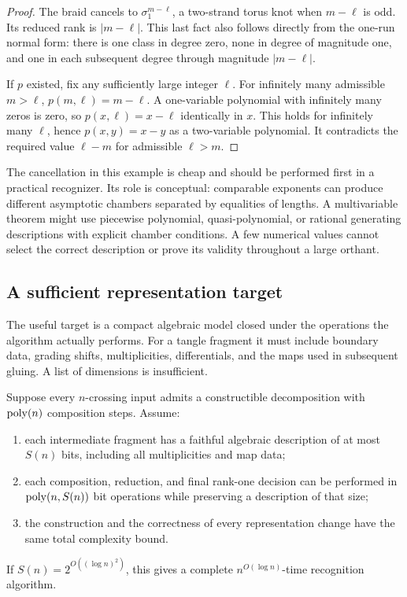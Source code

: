 \begin{proof}
The braid cancels to \(\sigma_1^{m-\ell}\), a two-strand torus knot
when \(m-\ell\) is odd. Its reduced rank is \(|m-\ell|\).
This last fact also follows directly from the one-run normal form:
there is one class in degree zero, none in degree of magnitude one,
and one in each subsequent degree through magnitude \(|m-\ell|\).

If \(p\) existed, fix any sufficiently large integer \(\ell\).
For infinitely many admissible \(m>\ell\),
\(p(m,\ell)=m-\ell\). A one-variable polynomial with infinitely many
zeros is zero, so \(p(x,\ell)=x-\ell\) identically in \(x\).
This holds for infinitely many \(\ell\), hence
\(p(x,y)=x-y\) as a two-variable polynomial.
It contradicts the required value \(\ell-m\) for admissible
\(\ell>m\).
\end{proof}

The cancellation in this example is cheap and should be performed first
in a practical recognizer. Its role is conceptual: comparable exponents
can produce different asymptotic chambers separated by equalities of
lengths. A multivariable theorem might use piecewise polynomial,
quasi-polynomial, or rational generating descriptions with explicit
chamber conditions. A few numerical values cannot select the correct
description or prove its validity throughout a large orthant.

\subsection{A sufficient representation target}

The useful target is a compact algebraic model closed under the operations
the algorithm actually performs. For a tangle fragment it must include
boundary data, grading shifts, multiplicities, differentials, and the
maps used in subsequent gluing. A list of dimensions is insufficient.

\begin{proposition}\label{prop:contract}
Suppose every \(n\)-crossing input admits a constructible decomposition
with \(\operatorname{poly}(n)\) composition steps. Assume:
\begin{enumerate}
\item each intermediate fragment has a faithful algebraic description
of at most \(S(n)\) bits, including all multiplicities and map data;
\item each composition, reduction, and final rank-one decision can be
performed in \(\operatorname{poly}(n,S(n))\) bit operations while preserving a
description of that size;
\item the construction and the correctness of every representation
change have the same total complexity bound.
\end{enumerate}
If \(S(n)=2^{O((\log n)^2)}\), this gives a complete
\(n^{O(\log n)}\)-time recognition algorithm.
\end{proposition}

